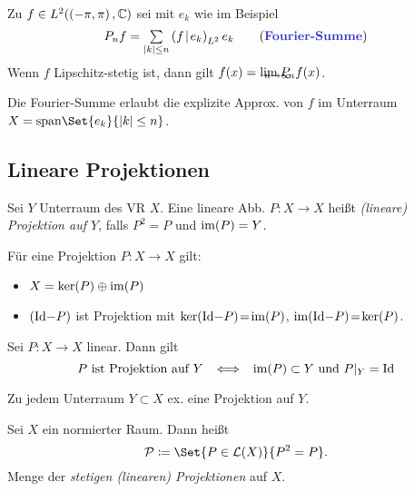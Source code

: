 \documentclass{cheat-sheet}
\newcommand{\LSO}{\mathcal{L}} %
\newcommand{\scp}[2]{\left( #1 \!\mid\! #2 \right)} %
\begin{document}
\begin{lem}
  Zu $f \in L^2(\left( -\pi, \pi \right), \mathbb{C})$ sei mit $e_k$ wie im Beispiel
  \[ P_n f = \sum_{\abs{k} \leq n} \scp{f}{e_k}_{L^2} e_k \tag*{(\emph{Fourier-Summe})} \]
  Wenn $f$ Lipschitz-stetig ist, dann gilt $f(x) = \lim_{\mathclap{n \to \infty}} P_n f(x)$.
\end{lem}

\begin{samepage}

\begin{bem}
  Die Fourier-Summe erlaubt die explizite Approx. von $f$ im Unterraum $X = \mathrm{span} \Set{e_k}{ \abs{k} \leq n }$.
\end{bem}


\subsection{Lineare Projektionen}

\end{samepage}

\begin{defn}
  Sei $Y$ Unterraum des VR $X$. Eine lineare Abb. $P : X \to X$ heißt \emph{(lineare) Projektion auf $Y$}, falls $P^2 = P$ und $\mathop{\mathrm{im}}(P) = Y$.
\end{defn}

\begin{lem}
  Für eine Projektion $P : X \to X$ gilt:
  \begin{itemize}
    \item $X = \ker(P) \oplus \mathop{\mathrm{im}}(P)$
    \item $(\mathrm{Id} {-} P)$ ist Projektion mit $\ker(\mathrm{Id} {-} P) \!=\! \mathop{\mathrm{im}}(P)$, $\mathop{\mathrm{im}}(\mathrm{Id} {-} P) \!=\! \ker(P)$.
  \end{itemize}
\end{lem}

\begin{lem}
  Sei $P : X \to X$ linear. Dann gilt
  \[
    \text{$P$ ist Projektion auf $Y$}
    \enspace \iff \enspace
    \mathop{\mathrm{im}}(P) \subset Y \text{ und } P|_Y = \mathrm{Id}
  \]
\end{lem}

\begin{bem}
  Zu jedem Unterraum $Y \subset X$ ex. eine Projektion auf $Y$.
\end{bem}

\begin{defn}
  Sei $X$ ein normierter Raum. Dann heißt
  \[ \mathcal{P} \coloneqq \Set{P \in \LSO(X)}{P^2 = P}. \]
  Menge der \emph{stetigen (linearen) Projektionen} auf $X$.
\end{defn}
\end{document}
